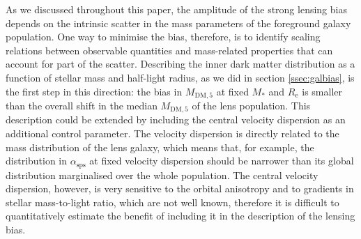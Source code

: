 \documentclass{aa}
\def\reff{R_{\mathrm{e}}}
\def\mstar{M_*}
\def\asps{\alpha_{\mathrm{sps}}}
\def\mdmfive{M_{\mathrm{DM}, 5}}
\begin{document}
As we discussed throughout this paper, the amplitude of the strong lensing bias depends on the intrinsic scatter in the mass parameters of the foreground galaxy population.
One way to minimise the bias, therefore, is to identify scaling relations between observable quantities and mass-related properties that can account for part of the scatter.
Describing the inner dark matter distribution as a function of stellar mass and half-light radius, as we did in section \ref{ssec:galbias}, is the first step in this direction: the bias in $\mdmfive$ at fixed $\mstar$ and $\reff$ is smaller than the overall shift in the median $\mdmfive$ of the lens population.
This description could be extended by including the central velocity dispersion as an additional control parameter. The velocity dispersion is directly related to the mass distribution of the lens galaxy, which means that, for example, the distribution in $\asps$ at fixed velocity dispersion should be narrower than its global distribution marginalised over the whole population. 
The central velocity dispersion, however, is very sensitive to the orbital anisotropy and to gradients in stellar mass-to-light ratio, which are not well known, therefore it is difficult to quantitatively estimate the benefit of including it in the description of the lensing bias.

\end{document}
